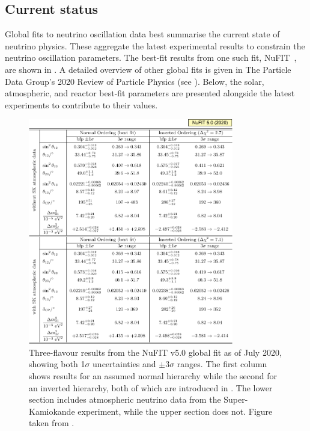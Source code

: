 \subsection{Current status} %
\label{sec:theory_status_current} %

Global fits to neutrino oscillation data best summarise the current state of neutrino physics.
These aggregate the latest experimental results to constrain the neutrino oscillation parameters.
The best-fit results from one such fit, NuFIT~\cite{esteban2019, esteban2020}, are shown in
. A detailed overview of other global fits is given in The Particle Data
Group's 2020 Review of Particle Physics (see ). Below, the solar,
atmospheric, and reactor best-fit parameters are presented alongside the latest experiments to
contribute to their values.

\begin{figure} %
    \includegraphics[origin=c,width=0.8\textwidth]{diagrams/3-theory/best_fit.pdf}
    \caption[Three-flavour results from the NuFIT v5.0 global neutrino oscillation fit]
    {Three-flavour results from the NuFIT v5.0 global fit as of July 2020, showing both 1$\sigma$
        uncertainties and $\pm 3 \sigma$ ranges. The first column shows results for an assumed
        normal hierarchy while the second for an inverted hierarchy, both of which are introduced
        in . The lower section includes atmospheric neutrino
        data from the Super-Kamiokande experiment, while the upper section does not. Figure taken
        from .}
    \label{fig:best_fit}
\end{figure}

